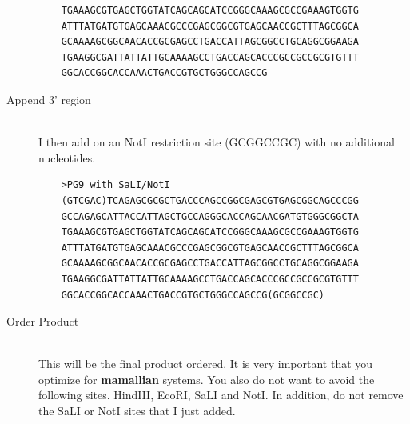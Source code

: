 \begin{description}
\begin{verbatim}
    TGAAAGCGTGAGCTGGTATCAGCAGCATCCGGGCAAAGCGCCGAAAGTGGTG
    ATTTATGATGTGAGCAAACGCCCGAGCGGCGTGAGCAACCGCTTTAGCGGCA
    GCAAAAGCGGCAACACCGCGAGCCTGACCATTAGCGGCCTGCAGGCGGAAGA
    TGAAGGCGATTATTATTGCAAAAGCCTGACCAGCACCCGCCGCCGCGTGTTT
    GGCACCGGCACCAAACTGACCGTGCTGGGCCAGCCG
    \end{verbatim}
   \item[Append 3' region] \hfill \\
   I then add on an NotI restriction site (GCGGCCGC) with no additional nucleotides.
    \begin{verbatim}
    >PG9_with_SaLI/NotI
    (GTCGAC)TCAGAGCGCGCTGACCCAGCCGGCGAGCGTGAGCGGCAGCCCGG
    GCCAGAGCATTACCATTAGCTGCCAGGGCACCAGCAACGATGTGGGCGGCTA
    TGAAAGCGTGAGCTGGTATCAGCAGCATCCGGGCAAAGCGCCGAAAGTGGTG
    ATTTATGATGTGAGCAAACGCCCGAGCGGCGTGAGCAACCGCTTTAGCGGCA
    GCAAAAGCGGCAACACCGCGAGCCTGACCATTAGCGGCCTGCAGGCGGAAGA
    TGAAGGCGATTATTATTGCAAAAGCCTGACCAGCACCCGCCGCCGCGTGTTT
    GGCACCGGCACCAAACTGACCGTGCTGGGCCAGCCG(GCGGCCGC)
    \end{verbatim}
   \item[Order Product] \hfill \\
   This will be the final product ordered. It is very important that you optimize for \textbf{mamallian} systems. You also do not want to avoid the following sites. HindIII, EcoRI, SaLI and NotI. In addition, do not remove the SaLI or NotI sites that I just added.
\end{description}

